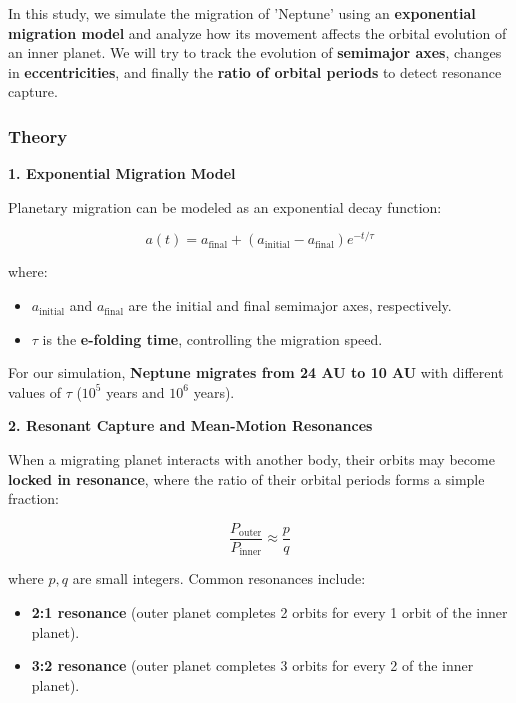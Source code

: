 \documentclass[12pt,a4paper]{article}
\begin{document}
In this study, we simulate the migration of 'Neptune' using an \textbf{exponential migration model} and analyze how its movement affects the orbital evolution of an inner planet. We will try to track the evolution of \textbf{semimajor axes}, changes in \textbf{eccentricities}, and finally the \textbf{ratio of orbital periods} to detect resonance capture.

\subsubsection{Theory}

\textbf{1. Exponential Migration Model}

Planetary migration can be modeled as an exponential decay function:

\begin{equation}
    a(t) = a_{\text{final}} + (a_{\text{initial}} - a_{\text{final}}) e^{-t/\tau}
\end{equation}

where:
\begin{itemize}
    \item \( a_{\text{initial}} \) and \( a_{\text{final}} \) are the initial and final semimajor axes, respectively.
    \item \( \tau \) is the \textbf{e-folding time}, controlling the migration speed.
\end{itemize}

For our simulation, \textbf{Neptune migrates from 24 AU to 10 AU} with different values of \( \tau \) (\( 10^5 \) years and \( 10^6 \) years). 

\textbf{2. Resonant Capture and Mean-Motion Resonances}

When a migrating planet interacts with another body, their orbits may become \textbf{locked in resonance}, where the ratio of their orbital periods forms a simple fraction:

\begin{equation}
    \frac{P_{\text{outer}}}{P_{\text{inner}}} \approx \frac{p}{q}
\end{equation}

where \( p, q \) are small integers. Common resonances include:
\begin{itemize}
    \item \textbf{2:1 resonance} (outer planet completes 2 orbits for every 1 orbit of the inner planet).
    \item \textbf{3:2 resonance} (outer planet completes 3 orbits for every 2 of the inner planet).
\end{itemize}
\end{document}
